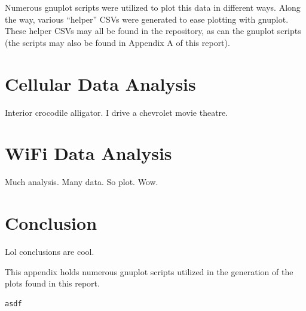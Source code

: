 \documentclass[journal,twocolumn]{IEEEtran}
\begin{document}
Numerous gnuplot scripts were utilized to plot this data in different ways. 
Along the way, various ``helper'' CSVs were generated to ease plotting with 
gnuplot. These helper CSVs may all be found in the repository, as can  the 
gnuplot scripts (the scripts may also be found in Appendix A of this report).

\section{Cellular Data Analysis}

Interior crocodile alligator. I drive a chevrolet movie theatre.

\section{WiFi Data Analysis}

Much analysis. Many data. So plot. Wow.

\section{Conclusion}

Lol conclusions are cool.


This appendix holds numerous gnuplot scripts utilized in the 
generation of the plots found in this report.

\begin{lstlisting}
asdf
\end{lstlisting}
\end{document}
